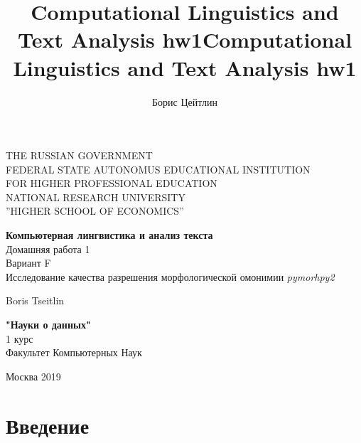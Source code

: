 \documentclass[a4paper,14pt]{article}
\author{Борис Цейтлин}
\title{Computational Linguistics and Text Analysis hw1}
\title{Computational Linguistics and Text Analysis hw1}
\begin{document}
	\thispagestyle{empty}    %
	
	\begin{center}
		
		
		THE RUSSIAN GOVERNMENT \\
		FEDERAL STATE AUTONOMUS EDUCATIONAL INSTITUTION \\ FOR HIGHER PROFESSIONAL EDUCATION \\ NATIONAL RESEARCH UNIVERSITY \\ ''HIGHER SCHOOL OF ECONOMICS''
		
		\large
		\vspace{2 cm}
	\end{center}
	
	\vspace{2 cm}
	\begin{center}
		\vspace{1 cm} \textbf{Компьютерная лингвистика и анализ текста} \\ \vspace{0.5 cm} Домашняя работа 1 \\ Вариант F 
		\\ Исследование качества разрешения морфологической омонимии \textit{pymorhpy2}
		
	\end{center}
	
	\vspace{2 cm}
	
	\begin{flushright}
		{  Boris Tseitlin }
		
		\vspace{1 cm}
		
		{ \textbf{"Науки о данных" } \\ 1 курс\\
			Факультет Компьютерных Наук }
	\end{flushright}
	
	\begin{center}
		\vfill
		Москва 2019
	\end{center}
	
	\newpage
	\tableofcontents
	\newpage
	
	
	\section{Введение}
	
\end{document}
